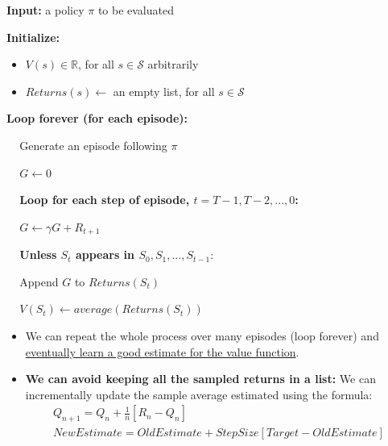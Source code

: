 \documentclass[12pt, a4paper]{article}
\begin{document}
\begin{tcolorbox}[title={First-visit MC prediction, for estimating $V \approx v_\pi$}]

  \textbf{Input:} a policy $\pi$ to be evaluated

  \textbf{Initialize:}
  \begin{itemize}
    \item $V(s) \in \mathbb{R}$, for all $s \in \mathcal{S}$ arbitrarily
    \item $Returns(s) \leftarrow$ an empty list, for all $s \in \mathcal{S}$
  \end{itemize}

  \textbf{Loop forever (for each episode):}
  \begin{description}
      \item $\;\;\;$ Generate an episode following $\pi$
      \item $\;\;\;$ $G \leftarrow 0$
      \item $\;\;\;$ \textbf{Loop for each step of episode, $t=T-1,T-2,...,0$:}
      \begin{description}
        \item $\;\;\;$ $G \leftarrow \gamma G + R_{t+1}$
        \item $\;\;\;$ \textbf{Unless $S_t$ appears in $S_0, S_1, ..., S_{t-1}:$}
        \begin{description}
          \item $\;\;\;$ Append $G$ to $Returns(S_t)$
          \item $\;\;\;$ $V(S_t) \leftarrow average(Returns(S_t))$
        \end{description}
      \end{description}
  \end{description}
\end{tcolorbox}

\begin{itemize}
  \item We can repeat the whole process over many episodes (loop forever) and \uline{eventually learn a good estimate for the value function}.
  \item \textbf{We can avoid keeping all the sampled returns in a list:} We can incrementally update the sample average estimated using the formula:
  \begin{gather*}
    Q_{n+1} = Q_n + \frac{1}{n}[R_n - Q_n] \\
    NewEstimate = OldEstimate + StepSize[Target - OldEstimate]
  \end{gather*}
\end{itemize}
\end{document}
